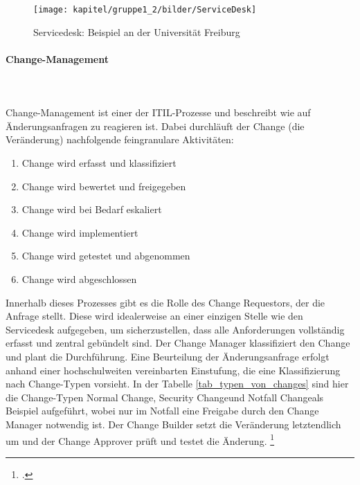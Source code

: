 \begin{figure}[h!]
	\centering
	\texttt{[image: kapitel/gruppe1\_2/bilder/ServiceDesk]}
	\caption{Servicedesk: Beispiel an der Universität Freiburg\protect\footnotemark}
	\label{fig_service_desk}
\end{figure}



\paragraph{Change-Management}\mbox{}\\\\
Change-Management ist einer der ITIL-Prozesse und beschreibt wie auf Änderungsanfragen zu reagieren ist. Dabei durchläuft der Change (die Veränderung) nachfolgende feingranulare Aktivitäten:

\begin{enumerate}
	\item Change wird erfasst und klassifiziert
	\item Change wird bewertet und freigegeben
	\item Change wird bei Bedarf eskaliert
	\item Change wird implementiert
	\item Change wird getestet und abgenommen
	\item Change wird abgeschlossen
\end{enumerate}

Innerhalb dieses Prozesses gibt es die Rolle des Change Requestors, der die Anfrage stellt. Diese wird idealerweise an einer einzigen Stelle wie den Servicedesk aufgegeben, um sicherzustellen, dass alle Anforderungen vollständig erfasst und zentral gebündelt sind. Der Change Manager klassifiziert den Change und plant die Durchführung. Eine Beurteilung der Änderungsanfrage erfolgt anhand einer hochschulweiten vereinbarten Einstufung, die eine Klassifizierung nach Change-Typen vorsieht. In der Tabelle \ref{tab_typen_von_changes} sind hier die Change-Typen \glqq Normal Change\grqq, \glqq Security Change\grqq und \glqq Notfall Change\grqq als Beispiel aufgeführt, wobei nur im Notfall eine Freigabe durch den Change Manager notwendig ist. Der Change Builder setzt die Veränderung letztendlich um und der Change Approver prüft und testet die Änderung. \footcite[Vgl.][48]{breiter_implementierung_2011}

